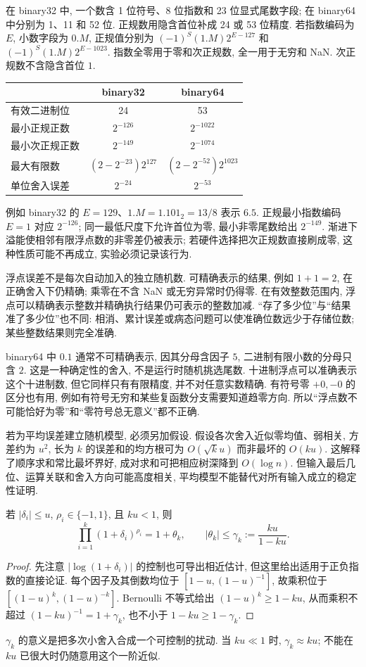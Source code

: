 在 binary32 中, 一个数含 1 位符号、8 位指数和 23 位显式尾数字段; 在 binary64 中分别为 1、11 和 52 位. 正规数用隐含首位补成 24 或 53 位精度. 若指数编码为 $E$, 小数字段为 $0.M$, 正规值分别为 $(-1)^S(1.M)2^{E-127}$ 和 $(-1)^S(1.M)2^{E-1023}$. 指数全零用于零和次正规数, 全一用于无穷和 NaN. 次正规数不含隐含首位 $1$.
\begin{center}
\begin{tabular}{lcc}
\toprule
 & binary32 & binary64\\
\midrule
有效二进制位 & 24 & 53\\
最小正规正数 & $2^{-126}$ & $2^{-1022}$\\
最小次正规正数 & $2^{-149}$ & $2^{-1074}$\\
最大有限数 & $(2-2^{-23})2^{127}$ & $(2-2^{-52})2^{1023}$\\
单位舍入误差 & $2^{-24}$ & $2^{-53}$\\
\bottomrule
\end{tabular}
\end{center}
例如 binary32 的 $E=129$、$1.M=1.101_2=13/8$ 表示 $6.5$. 正规最小指数编码 $E=1$ 对应 $2^{-126}$; 同一最低尺度下允许首位为零, 最小非零尾数给出 $2^{-149}$. 渐进下溢能使相邻有限浮点数的非零差仍被表示; 若硬件选择把次正规数直接刷成零, 这种性质可能不再成立, 实验必须记录该行为.

浮点误差不是每次自动加入的独立随机数. 可精确表示的结果, 例如 $1+1=2$, 在正确舍入下仍精确; 乘零在不含 NaN 或无穷异常时仍得零. 在有效整数范围内, 浮点可以精确表示整数并精确执行结果仍可表示的整数加减. “存了多少位”与“结果准了多少位”也不同: 相消、累计误差或病态问题可以使准确位数远少于存储位数; 某些整数结果则完全准确.

binary64 中 $0.1$ 通常不可精确表示, 因其分母含因子 $5$, 二进制有限小数的分母只含 $2$. 这是一种确定性的舍入, 不是运行时随机挑选尾数. 十进制浮点可以准确表示这个十进制数, 但它同样只有有限精度, 并不对任意实数精确. 有符号零 $+0,-0$ 的区分也有用, 例如有符号无穷和某些复函数分支需要知道趋零方向. 所以“浮点数不可能恰好为零”和“零符号总无意义”都不正确.

若为平均误差建立随机模型, 必须另加假设. 假设各次舍入近似零均值、弱相关, 方差约为 $u^2$, 长为 $k$ 的误差和的均方根可为 $O(\sqrt{k}u)$ 而非最坏的 $O(ku)$. 这解释了顺序求和常比最坏界好, 成对求和可把相应树深降到 $O(\log n)$. 但输入最后几位、运算关联和舍入方向可能高度相关, 平均模型不能替代对所有输入成立的稳定性证明.

\begin{lemma}\label{lem:gamma}
若 $|\delta_i|\le u$, $\rho_i\in\{-1,1\}$, 且 $ku<1$, 则
\[
\prod_{i=1}^{k}(1+\delta_i)^{\rho_i}=1+\theta_k,
\qquad |\theta_k|\le\gamma_k:=\frac{ku}{1-ku}.
\]
\end{lemma}
\begin{proof}
先注意 $|\log(1+\delta_i)|$ 的控制也可导出相近估计, 但这里给出适用于正负指数的直接论证. 每个因子及其倒数均位于 $[1-u,(1-u)^{-1}]$, 故乘积位于 $[(1-u)^k,(1-u)^{-k}]$. Bernoulli 不等式给出 $(1-u)^k\ge1-ku$, 从而乘积不超过 $(1-ku)^{-1}=1+\gamma_k$, 也不小于 $1-ku\ge1-\gamma_k$.
\end{proof}
$\gamma_k$ 的意义是把多次小舍入合成一个可控制的扰动. 当 $ku\ll1$ 时, $\gamma_k\approx ku$; 不能在 $ku$ 已很大时仍随意用这个一阶近似.

